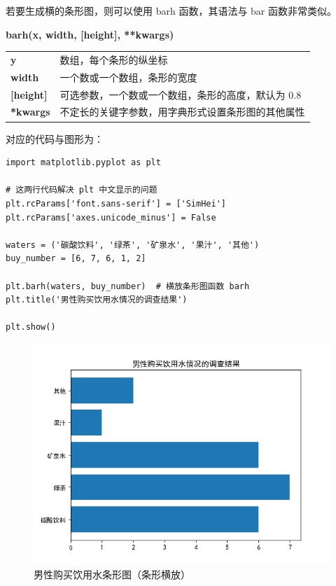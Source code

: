 若要生成横的条形图，则可以使用 barh 函数，其语法与 bar 函数非常类似。

\begin{center}
\begin{tcolorbox}[title = barh 函数的语法]
\textbf{barh(x, width, [height], **kwargs)}
\tcblower
\vspace{10pt}

\begin{tcboutputlisting}
\begin{tabular}{>{\bfseries}ll}
    y &数组，每个条形的纵坐标\\
    width & 一个数或一个数组，条形的宽度\\

  [height] &可选参数，一个数或一个数组，条形的高度，默认为 0.8\\

**kwargs &不定长的关键字参数，用字典形式设置条形图的其他属性
\end{tabular}
\end{tcboutputlisting}
\tcbuselistingtext
\end{tcolorbox}
\end{center}

对应的代码与图形为：

\begin{lstlisting}[Language=Python]
import matplotlib.pyplot as plt

# 这两行代码解决 plt 中文显示的问题
plt.rcParams['font.sans-serif'] = ['SimHei']
plt.rcParams['axes.unicode_minus'] = False

waters = ('碳酸饮料', '绿茶', '矿泉水', '果汁', '其他')
buy_number = [6, 7, 6, 1, 2]

plt.barh(waters, buy_number)  # 横放条形图函数 barh
plt.title('男性购买饮用水情况的调查结果')

plt.show()
\end{lstlisting}

\begin{figure}[!ht]
  \centering
  \includegraphics[scale=0.9]{figure/bar2.png}
  \caption{男性购买饮用水条形图（条形横放）}\label{fig:bar2}
\end{figure}



